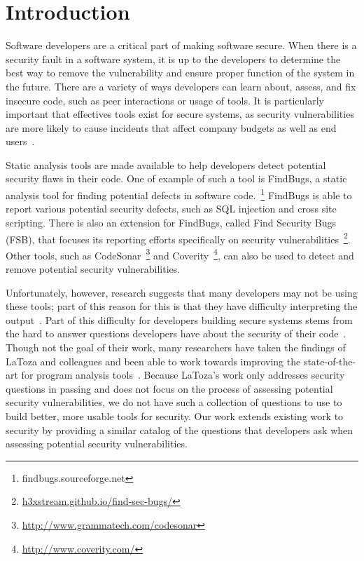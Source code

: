 \documentclass[conference]{IEEEtran}
\begin{document}
\section{Introduction}


Software developers are a critical part of making software secure. 
When there is a security fault in a software system, it is up to the developers to determine the best way to remove the vulnerability and ensure proper function of the system in the future.
There are a variety of ways developers can learn about, assess, and fix insecure code, such as peer interactions or usage of tools.
It is particularly important that effectives tools exist for secure systems, as security vulnerabilities are more likely to cause incidents that affect company budgets as well as end users~\cite{chen2002mops}. 

Static analysis tools are made available to help developers detect potential security flaws in their code. 
One of example of such a tool is FindBugs, a static analysis tool for finding potential defects in software code.~\footnote{findbugs.sourceforge.net} 
FindBugs is able to report various potential security defects, such as SQL injection and cross site scripting.  %
There is also an extension for FindBugs, called Find Security Bugs (FSB), that focuses its reporting efforts specifically on security vulnerabilities~\footnote{\url{h3xstream.github.io/find-sec-bugs/}}.
Other tools, such as CodeSonar~\footnote{\url{http://www.grammatech.com/codesonar}} and Coverity~\footnote{\url{http://www.coverity.com/}}, can also be used to detect and remove potential security vulnerabilities.

Unfortunately, however, research suggests that many developers may not be using these tools; part of this reason for this is that they have difficulty interpreting the output~\cite{johnson2013don}. 
Part of this difficulty for developers building secure systems stems from the hard to answer questions developers have about the security of their code~\cite{latoza2010hard}.
Though not the goal of their work, many researchers have taken the findings of LaToza and colleagues and been able to work towards improving the state-of-the-art for program analysis tools~\cite{kononenko2012automatically, servant2012history, yoon2013visualization}. 
Because LaToza's work only addresses security questions in passing and does not focus on the process of assessing potential security vulnerabilities, we do not have such a collection of questions to use to build better, more usable tools for security.
Our work extends existing work to security by providing a similar catalog of the questions that developers ask when assessing potential security vulnerabilities.
\end{document}
